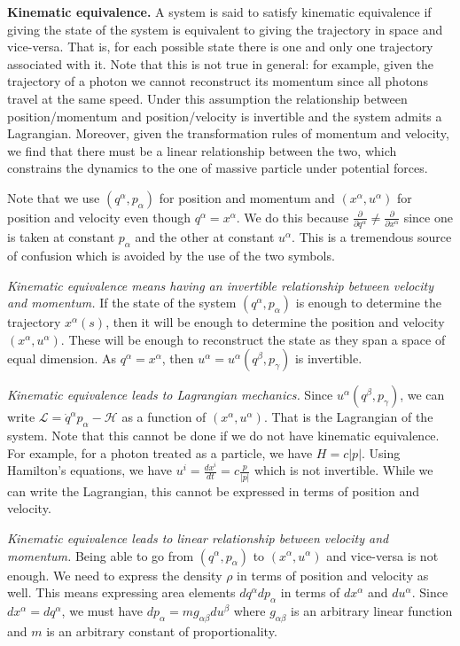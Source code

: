 \documentclass[twocolumn]{article}
\begin{document}
\textbf{Kinematic equivalence.} A system is said to satisfy kinematic equivalence if giving the state of the system is equivalent to giving the trajectory in space and vice-versa. That is, for each possible state there is one and only one trajectory associated with it. Note that this is not true in general: for example, given the trajectory of a photon we cannot reconstruct its momentum since all photons travel at the same speed. Under this assumption the relationship between position/momentum and position/velocity is invertible and the system admits a Lagrangian. Moreover, given the transformation rules of momentum and velocity, we find that there must be a linear relationship between the two, which constrains the dynamics to the one of massive particle under potential forces.

Note that we use $(q^\alpha, p_\alpha)$ for position and momentum and $(x^\alpha, u^\alpha)$ for position and velocity even though $q^\alpha = x^\alpha$. We do this because $\frac{\partial}{\partial q^\alpha} \neq \frac{\partial}{\partial x^\alpha}$ since one is taken at constant $p_\alpha$ and the other at constant $u^\alpha$. This is a tremendous source of confusion which is avoided by the use of the two symbols.

\emph{Kinematic equivalence means having an invertible relationship between velocity and momentum.} If the state of the system $(q^\alpha, p_\alpha)$ is enough to determine the trajectory $x^\alpha(s)$, then it will be enough to determine the position and velocity $(x^\alpha, u^\alpha)$. These will be enough to reconstruct the state as they span a space of equal dimension. As $q^\alpha = x^\alpha$, then $u^\alpha = u^\alpha(q^\beta, p_\gamma)$ is invertible.

\emph{Kinematic equivalence leads to Lagrangian mechanics.} Since $u^\alpha(q^\beta, p_\gamma)$, we can write $\mathcal{L} = \dot{q}^\alpha p_\alpha - \mathcal{H}$ as a function of $(x^\alpha, u^\alpha)$. That is the Lagrangian of the system. Note that this cannot be done if we do not have kinematic equivalence. For example, for a photon treated as a particle, we have $H = c |p|$. Using Hamilton's equations, we have $u^i = \frac{dx^i}{dt} = c \frac{p}{|p|}$ which is not invertible. While we can write the Lagrangian, this cannot be expressed in terms of position and velocity.

\emph{Kinematic equivalence leads to linear relationship between velocity and momentum.} Being able to go from $(q^\alpha, p_\alpha)$ to $(x^\alpha, u^\alpha)$ and vice-versa is not enough. We need to express the density $\rho$ in terms of position and velocity as well. This means expressing area elements $dq^\alpha dp_\alpha$ in terms of $dx^\alpha$ and $du^\alpha$. Since $dx^\alpha = dq^\alpha$, we must have $dp_\alpha = m g_{\alpha \beta} du^\beta$ where $g_{\alpha \beta}$ is an arbitrary linear function and $m$ is an arbitrary constant of proportionality. 
\end{document}

